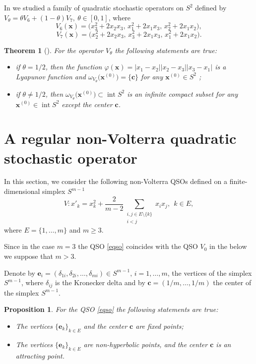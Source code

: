 \documentclass[11pt,reqno]{amsart}
\newtheorem{theorem}[subsection]{Theorem}
\newtheorem{proposition}[subsection]{Proposition}
\numberwithin{equation}{section} \setcounter{tocdepth}{1}
\DeclareMathOperator{\inte}{int}
\begin{document}
In \cite{Jjph} we studied a family of quadratic stochastic operators on $S^2$ defined by $V_\theta = \theta V_6 + (1 -\theta)V_7, \ \theta \in [0, 1]$, where
\[V_6(\mathbf{x}) = \big(x^2_3+ 2x_2x_3, \,  x^2_1+ 2x_1x_3, \,  x^2_2 + 2x_1x_2\big),\]
\[V_7(\mathbf{x}) = \big(x^2_2+ 2x_2x_3, \,  x^2_3+ 2x_1x_3, \,  x^2_1 + 2x_1x_2\big).\]
\begin{theorem} [\cite{Jjph}] For the operator $V_\theta$ the following statements are true:
\begin{itemize}
\item[i)] if $\theta = 1/2$, then the function  $\varphi(\mathbf{x}) = |x_1-x_2||x_2-x_3||x_3-x_1|$ is a Lyapunov
function and $\omega_{V_\theta} \big(\mathbf{x}^{(0)}\big)=\{\mathbf{c}\}$ for any $\mathbf{x}^{(0)}\in S^2$ ;
\item[ii)] if $\theta \neq 1/2$, then $\omega_{V_\theta} \big(\mathbf{x}^{(0)}\big)\subset \inte S^2$ is an infinite compact subset for any
$\mathbf{x}^{(0)}\in \inte S^2$ except the center $\mathbf{c}$.
\end{itemize}
\end{theorem}

\section{A regular non-Volterra quadratic stochastic operator}
\label{sec:regularoperator}

In this section, we consider  the following  non-Volterra QSOs defined on a finite-dimensional simplex $S^{m-1}$
\begin{equation}\label{eqso}
V: x'_k= x_k^2 +\frac{2}{m-2}\displaystyle\sum_{\substack{i,j\in E\setminus\{k\}\\ i<j}}  x_ix_j,\  \ k \in E,
\end{equation}
where $E=\{1,\dots,m\}$ and  $m\geq3$.

Since in the case $m=3$ the QSO \eqref{eqso} coincides with the QSO $V_0$ in the below
we suppose that $m>3$.


Denote by $\mathbf{e}_i = (\delta_{1i},\delta_{2i}, \dots, \delta_{mi}) \in S^{m-1}, \, i = 1,\dots,m$, the vertices of the simplex $S^{m-1}$,
where $\delta_{ij}$ is the Kronecker delta and by $\mathbf{c}=(1/m,\dots,1/m)$ the center of the simplex $S^{m-1}$.

\begin{proposition} For the QSO \eqref{eqso} the following statements are true:
\begin{itemize}
\item[i)] The vertices $\{\mathbf{e}_k\}_{k\in E}$ and the center $\mathbf{c}$ are fixed points;
\item[ii)] The vertices $\{\mathbf{e}_k\}_{k\in E}$  are non-hyperbolic points,
 and the center $\mathbf{c}$ is an attracting point.
\end{itemize}
\end{proposition}
\end{document}
